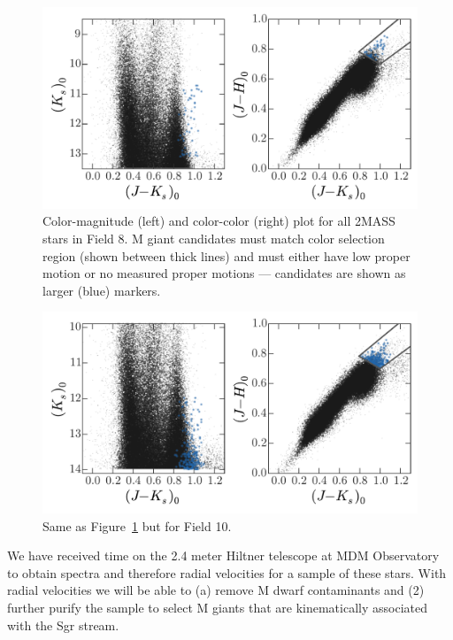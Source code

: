 \documentclass[letterpaper,12pt,preprint]{hack_aastex}
\begin{document}
\begin{figure}[p]
\begin{center}
\includegraphics[width=\textwidth]{fig1.pdf}
\caption{Color-magnitude (left) and color-color (right) plot for all 2MASS stars in Field 8. M giant candidates must match color selection region (shown between thick lines) and must either have low proper motion or no measured proper motions --- candidates are shown as larger (blue) markers. } 
\label{fig:field8}
\end{center}
\end{figure}

\begin{figure}[p]
\begin{center}
\includegraphics[width=\textwidth]{fig2.pdf}
\caption{Same as Figure~\ref{fig:field8} but for Field 10. } 
\label{fig:field10}
\end{center}
\end{figure}

We have received time on the 2.4 meter Hiltner telescope at MDM Observatory to obtain spectra and therefore radial velocities for a sample of these stars. With radial velocities we will be able to (a) remove M dwarf contaminants and (2) further purify the sample to select M giants that are kinematically associated with the Sgr stream. 
\end{document}
